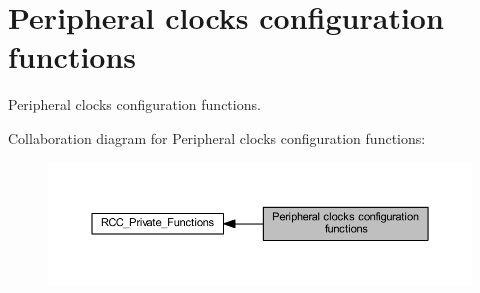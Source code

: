 \hypertarget{group___r_c_c___group3}{}\section{Peripheral clocks configuration functions}
\label{group___r_c_c___group3}


Peripheral clocks configuration functions.  


Collaboration diagram for Peripheral clocks configuration functions\+:\nopagebreak
\begin{figure}[H]
\begin{center}
\leavevmode
\includegraphics[width=350pt]{group___r_c_c___group3}
\end{center}
\end{figure}
